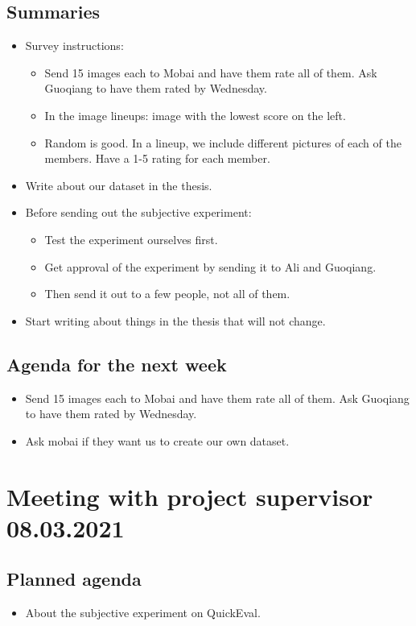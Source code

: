 \subsection*{Summaries}
\begin{itemize}
    \item Survey instructions:
    \begin{itemize}
        \item Send 15 images each to Mobai and have them rate all of them. Ask Guoqiang to have them rated by Wednesday.
        \item In the image lineups: image with the lowest score on the left.
        \item Random is good. In a lineup, we include different pictures of each of the members. Have a 1-5 rating for each member.
    \end{itemize}
    \item Write about our dataset in the thesis.
    \item Before sending out the subjective experiment:
    \begin{itemize}
        \item Test the experiment ourselves first.
        \item Get approval of the experiment by sending it to Ali and Guoqiang.
        \item Then send it out to a few people, not all of them.
    \end{itemize}
    \item Start writing about things in the thesis that will not change.
\end{itemize}

\subsection*{Agenda for the next week}
\begin{itemize}
    \item Send 15 images each to Mobai and have them rate all of them. Ask Guoqiang to have them rated by Wednesday.
    \item Ask mobai if they want us to create our own dataset.
\end{itemize}

\newpage

\section*{Meeting with project supervisor 08.03.2021}
\subsection*{Planned agenda}
\begin{itemize}
    \item About the subjective experiment on QuickEval.
\end{itemize}

